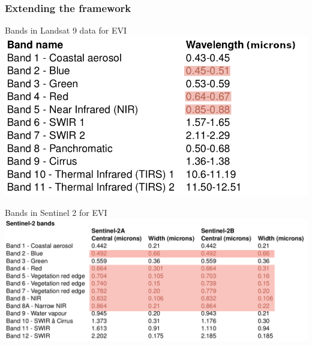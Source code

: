 \documentclass[aspectratio=169]{beamer} %
\begin{document}
\subsubsection{Extending the framework}

\begin{frame}{Bands in Landsat 9 data for EVI}
  \includegraphics[width = .5\linewidth]{landsat_bands.png}
\end{frame}

\begin{frame}{Bands in Sentinel 2 for EVI}
  \includegraphics[width = .8\linewidth]{sentinel_evi.png}
  
      

\end{frame}
\end{document}
